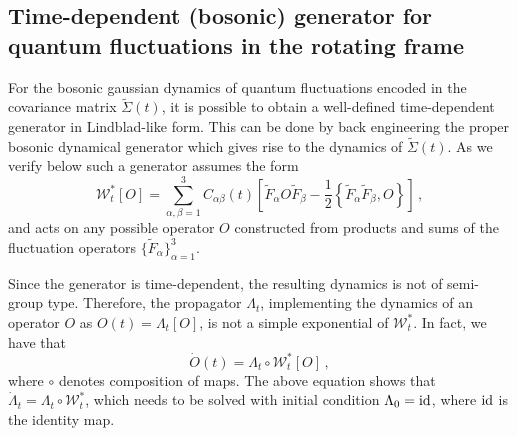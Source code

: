 \documentclass[prl,superscriptaddress,showpacs,longbibliography,reprint]{revtex4-2}
\begin{document}
\subsection{Time-dependent (bosonic) generator for quantum fluctuations in the rotating frame}
For the bosonic gaussian dynamics of quantum fluctuations encoded in the covariance matrix $\tilde{\Sigma}(t)$, it is possible to obtain a well-defined time-dependent generator in Lindblad-like form. This can be done by back engineering the proper bosonic dynamical generator which gives rise to the  dynamics of $\tilde{\Sigma}(t)$. As we verify below such a generator assumes the form 
\begin{equation}
\mathcal{W}_t^*[O]=\sum_{\alpha,\beta=1}^{3}C_{\alpha\beta}(t)\left[ \tilde{F}_\alpha O \tilde{F}_\beta -\frac{1}{2}\left\{\tilde{F}_\alpha \tilde{F}_\beta, O\right\}\right]\, ,
\label{bos-gen-SM}
\end{equation}
and acts on any possible operator $O$ constructed from products and sums of the fluctuation operators $\{\tilde{F}_\alpha\}_{\alpha=1}^{3}$. 

Since the generator is time-dependent, the resulting dynamics is not of semi-group type. Therefore, the propagator $\Lambda_t$, implementing the dynamics of an operator $O$ as $O(t)=\Lambda_t[O]$, is not a simple exponential of $\mathcal{W}_t^*$. In fact, we have that
\begin{equation*}
\dot{O}(t)=\Lambda_t\circ \mathcal{W}_t^*[O]\, ,
\end{equation*}
where $\circ$ denotes composition of maps. The above equation shows that $\dot{\Lambda}_t=\Lambda_t\circ \mathcal{W}_t^*$, which needs to be solved with initial condition $\Lambda_0={\rm id}$, where ${\rm id}$ is the identity map. \\
\end{document}
